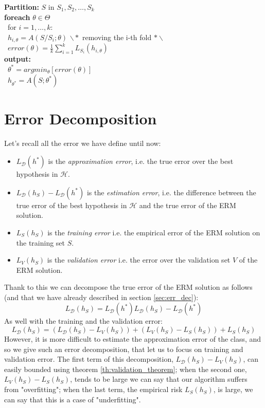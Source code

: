 \documentclass[12pt]{report}
\theoremstyle{plain}
\newcommand\mcl[1]{\mathcal{#1}}
\begin{document}
\begin{flushleft}
\begin{tcolorbox}
	\textbf{Partition:} $S$ in $S_1,S_2,\dots,S_k$\\
	
	\textbf{foreach} $\theta\in\Theta$\\
	\-\ for $i=1,\dots,k:$\\
	\-\ \quad $h_{i,\theta}=A(S/S_i;\theta)$ \qquad\qquad $\backslash*$ 
	removing the i-th fold $*\backslash$\\
	\-\ $error(\theta) = \frac{1}{k}\sum_{i=1}^k L_{S_i}(h_{i,\theta})$\\
	
	\textbf{output:}\\
	\-\ $\theta^* = argmin_\theta\left[error(\theta)\right]$\\
	\-\ $h_{\theta^*} = A(S;\theta^*)$
\label{box:k_fold}
\end{tcolorbox}

\section*{Error Decomposition}
Let's recall all the error we have define until now:
\begin{itemize}
	\item $L_\mcl{D}(h^*)$ is the \textit{approximation error}, i.e. the true 
	error over the best hypothesis in $\mcl{H}$.
	\item $L_\mcl{D}(h_S)-L_\mcl{D}(h^*)$ is the \textit{estimation error}, 
	i.e. the difference between the true error of the best hypothesis in 
	$\mcl{H}$ and the true error of the ERM solution.
	\item $L_S(h_S)$ is the \textit{training error} i.e. the empirical error of 
	the ERM solution on the training set $S$.
	\item $L_V(h_S)$ is the \textit{validation error} i.e. the error over the 
	validation set $V$ of the ERM solution.
\end{itemize}
Thank to this we can decompose the true error of the ERM solution as follows 
(and that we have already described in section \ref{sec:err_dec}):
\[ L_\mcl{D}(h_S) = L_\mcl{D}(h^*) L_\mcl{D}(h_S)-L_\mcl{D}(h^*) \]
As well with the training and the validation error:
\[ L_\mcl{D}(h_S) = (L_\mcl{D}(h_S)-L_V(h_S)) + (L_V(h_S)-L_S(h_S)) + L_S(h_S) 
\]
However, it is more difficult to estimate the approximation error of the class, 
and so we give such an error decomposition, that let us to focus on training 
and validation error. The first term of this decomposition, 
$L_\mcl{D}(h_S)-L_V(h_S)$, can easily bounded using theorem 
\ref{th:validation_theorem}; when the second one, $L_V(h_S)-L_S(h_S)$, tends to 
be large we can say that our algorithm suffers from "overfitting"; when the 
last term, the empirical risk $L_S(h_S)$, is large, we can say that this is a 
case of "underfitting". 



\end{flushleft}
\end{document}
